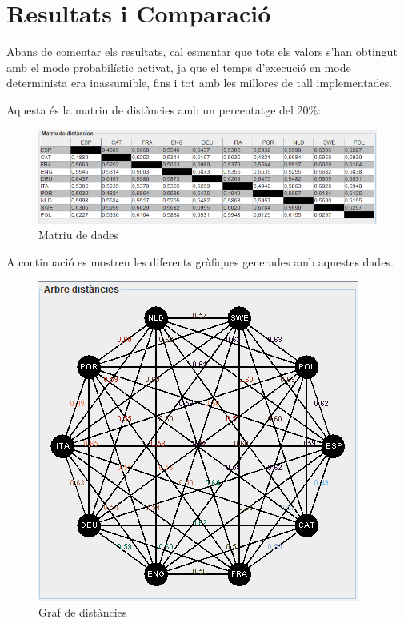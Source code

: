 \documentclass{ieeetj}
\begin{document}
\section{Resultats i Comparació}
Abans de comentar els resultats, cal esmentar que tots els valors s’han obtingut amb el mode probabilístic activat, ja que el temps d’execució en mode determinista era inassumible, fins i tot amb les millores de tall implementades.

Aquesta és la matriu de distàncies amb un percentatge del 20\%:
\begin{figure}[H]
    \centering
    \includegraphics[width=\linewidth]{png/20p.png}
    \caption{Matriu de dades}
    \label{fig:enter-label}
\end{figure}
A continuació es mostren les diferents gràfiques generades amb aquestes dades.

\begin{figure}[H]
    \centering
    \includegraphics[width=\linewidth]{png/graf.png}
    \caption{Graf de distàncies}
    \label{fig:enter-label}
\end{figure}
\end{document}
